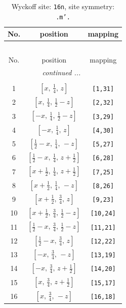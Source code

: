 \documentclass[fleqn,8pt]{jsarticle}
\begin{document}
\renewcommand{\arraystretch}{1.2}
\begin{longtable}{ccc}
\caption{Wyckoff site: {\tt 16n}, site symmetry: {\tt .m'.}}
 \\
 \hline \hline
No. & position & mapping \\ \hline \endfirsthead

\multicolumn{2}{l}{\tablename\ \thetable{}} \\
 \hline \hline
No. & position & mapping \\ \hline \endhead

 \hline \hline
\multicolumn{2}{r}{\footnotesize\it continued ...} \\ \endfoot

 \hline \hline
\multicolumn{2}{r}{} \\ \endlastfoot

1 & $\left[ x,\, \frac{1}{4},\, z \right]$ & {\tt [1,31]} \\ \hline
2 & $\left[ x,\, \frac{1}{4},\, \frac{1}{2} - z \right]$ & {\tt [2,32]} \\ \hline
3 & $\left[ - x,\, \frac{1}{4},\, \frac{1}{2} - z \right]$ & {\tt [3,29]} \\ \hline
4 & $\left[ - x,\, \frac{1}{4},\, z \right]$ & {\tt [4,30]} \\ \hline
5 & $\left[ \frac{1}{2} - x,\, \frac{1}{4},\, - z \right]$ & {\tt [5,27]} \\ \hline
6 & $\left[ \frac{1}{2} - x,\, \frac{1}{4},\, z + \frac{1}{2} \right]$ & {\tt [6,28]} \\ \hline
7 & $\left[ x + \frac{1}{2},\, \frac{1}{4},\, z + \frac{1}{2} \right]$ & {\tt [7,25]} \\ \hline
8 & $\left[ x + \frac{1}{2},\, \frac{1}{4},\, - z \right]$ & {\tt [8,26]} \\ \hline
9 & $\left[ x + \frac{1}{2},\, \frac{3}{4},\, z \right]$ & {\tt [9,23]} \\ \hline
10 & $\left[ x + \frac{1}{2},\, \frac{3}{4},\, \frac{1}{2} - z \right]$ & {\tt [10,24]} \\ \hline
11 & $\left[ \frac{1}{2} - x,\, \frac{3}{4},\, \frac{1}{2} - z \right]$ & {\tt [11,21]} \\ \hline
12 & $\left[ \frac{1}{2} - x,\, \frac{3}{4},\, z \right]$ & {\tt [12,22]} \\ \hline
13 & $\left[ - x,\, \frac{3}{4},\, - z \right]$ & {\tt [13,19]} \\ \hline
14 & $\left[ - x,\, \frac{3}{4},\, z + \frac{1}{2} \right]$ & {\tt [14,20]} \\ \hline
15 & $\left[ x,\, \frac{3}{4},\, z + \frac{1}{2} \right]$ & {\tt [15,17]} \\ \hline
16 & $\left[ x,\, \frac{3}{4},\, - z \right]$ & {\tt [16,18]} \\
\end{longtable}
\end{document}
